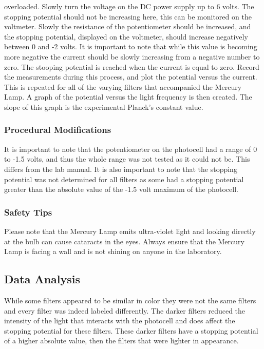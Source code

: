 \documentclass[a4paper]{article}
\begin{document}
overloaded. Slowly turn the voltage on the DC power supply up to 6
volts. The stopping potential should not be increasing here, this can
be monitored on the voltmeter. Slowly the resistance of the
potentiometer should be increased, and the stopping potential,
displayed on the voltmeter, should increase negatively between 0 and
-2 volts. It is important to note that while this value is becoming
more negative the current should be slowly increasing from a negative
number to zero. The stooping potential is reached when the current is
equal to zero. Record the measurements during this process, and plot
the potential versus the current. This is repeated for all of the
varying filters that accompanied the Mercury Lamp. A graph of the
potential versus the light frequency is then created. The slope of
this graph is the experimental Planck's constant value.

\subsubsection{Procedural Modifications}

\qq It is important to note that the potentiometer on the photocell
had a range of 0 to -1.5 volts, and thus the whole range was not
tested as it could not be. This differs from the lab manual. It is
also important to note that the stopping potential was not determined
for all filters as some had a stopping potential greater than the
absolute value of the -1.5 volt maximum of the photocell.

\subsubsection{Safety Tips}

\qq Please note that the Mercury Lamp emits ultra-violet light and
looking directly at the bulb can cause cataracts in the eyes. Always
ensure that the Mercury Lamp is facing a wall and is not shining on
anyone in the laboratory.


\subsection{Data Analysis}


\qq While some filters appeared to be similar in color they were not
the same filters and every filter was indeed labeled differently. The
darker filters reduced the intensity of the light that interacts with
the photocell and does affect the stopping potential for these
filters. These darker filters have a stopping potential of a higher
absolute value, then the filters that were lighter in appearance. 
\end{document}
